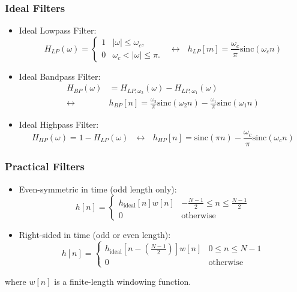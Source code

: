 \documentclass{beamer}
\begin{document}
\begin{frame}
  \frametitle{Ideal Filters}
  \begin{itemize}
  \item Ideal Lowpass Filter:
    \[
    H_{LP}(\omega)
    = \begin{cases} 1& |\omega|\le\omega_c,\\
      0 & \omega_c<|\omega|\le\pi.
    \end{cases}~~~\leftrightarrow~~~
    h_{LP}[m]=\frac{\omega_c}{\pi}\mbox{sinc}(\omega_c n)
    \]
  \item Ideal Bandpass Filter:
    \begin{align*}
      H_{BP}(\omega)&=H_{LP,\omega_2}(\omega)-H_{LP,\omega_1}(\omega)\\
      \leftrightarrow
      &h_{BP}[n]=\frac{\omega_2}{\pi}\mbox{sinc}(\omega_2 n)-\frac{\omega_1}{\pi}\mbox{sinc}(\omega_1 n)
    \end{align*}
  \item Ideal Highpass Filter:
    \[
    H_{HP}(\omega)=1-H_{LP}(\omega)~~~\leftrightarrow~~~
    h_{HP}[n]=\mbox{sinc}(\pi n)-\frac{\omega_c}{\pi}\mbox{sinc}(\omega_c n)
    \]
  \end{itemize}
\end{frame}

\begin{frame}
  \frametitle{Practical Filters}
  \begin{itemize}
  \item Even-symmetric in time (odd length only):
    \[
    h[n] = \begin{cases}
      h_{\mbox{ideal}}[n]w[n] & -\frac{N-1}{2}\le n\le \frac{N-1}{2}\\
      0 & \mbox{otherwise}
    \end{cases}
    \]
  \item Right-sided in time (odd or even length):
    \[
    h[n] = \begin{cases}
      h_{\mbox{ideal}}\left[n-\left(\frac{N-1}{2}\right)\right]w[n] & 0\le n\le N-1\\
      0 & \mbox{otherwise}
    \end{cases}
    \]
  \end{itemize}
  where $w[n]$ is a finite-length windowing function.
\end{frame}
\end{document}
